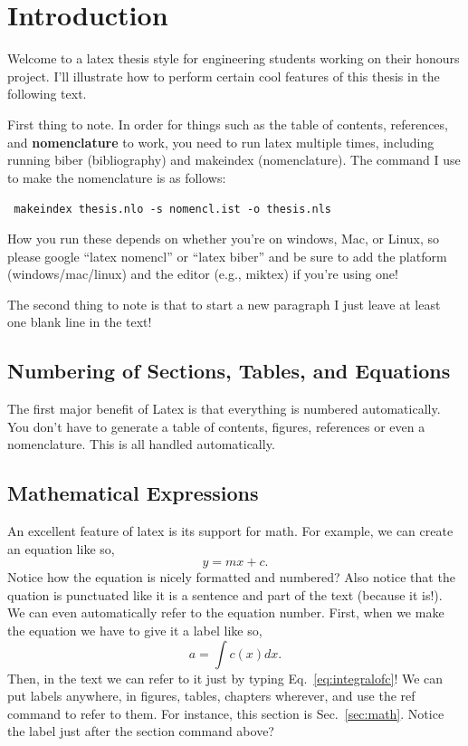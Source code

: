 \documentclass[12pt]{UoAThesis}
\begin{document}
\chapter{Introduction}
Welcome to a latex thesis style for engineering students working on
their honours project. I'll illustrate how to perform certain cool
features of this thesis in the following text.

First thing to note. In order for things such as the table of
contents, references, and {\bf nomenclature} to work, you need to run
latex multiple times, including running biber (bibliography)
and makeindex (nomenclature). The command I use to make the
nomenclature is as follows:

{\tt
  makeindex thesis.nlo -s nomencl.ist -o thesis.nls
}

How you run these depends on whether you're on windows, Mac, or Linux,
so please google ``latex nomencl'' or ``latex biber'' and be sure to
add the platform (windows/mac/linux) and the editor (e.g., miktex) if
you're using one!

The second thing to note is that to start a new paragraph I just
leave at least one blank line in the text!

\section{Numbering of Sections, Tables, and Equations}
The first major benefit of Latex is that everything is numbered
automatically. You don't have to generate a table of contents,
figures, references or even a nomenclature. This is all handled
automatically.

\section{\label{sec:math} Mathematical Expressions}
An excellent feature of latex is its support for math. For example, we
can create an equation like so,
\begin{equation}
  y = mx+c.
\end{equation}
Notice how the equation is nicely formatted and numbered? Also notice
that the quation is punctuated like it is a sentence and part of the
text (because it is!). We can even automatically refer to the equation
number. First, when we make the equation we have to give it a label
like so,
\begin{equation}\label{eq:integralofc}
  a = \int c(x)dx.
\end{equation}
Then, in the text we can refer to it just by typing
Eq.~\ref{eq:integralofc}! We can put labels anywhere, in figures,
tables, chapters wherever, and use the ref command to refer to
them. For instance, this section is Sec.~\ref{sec:math}. Notice the
label just after the section command above?
\end{document}
